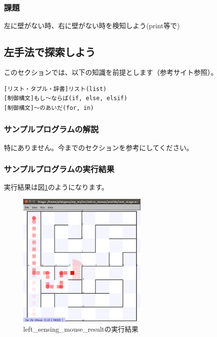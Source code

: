 \documentclass[11pt,a4paper]{jsarticle}
\begin{document}
\subsubsection{課題}
左に壁がない時、右に壁がない時を検知しよう(print等で)



\newpage
\subsection{左手法で探索しよう}
このセクションでは、以下の知識を前提とします（参考サイト参照）。
\begin{lstlisting}[frame=single]
[リスト・タプル・辞書]リスト(list)
[制御構文]もし～ならば(if, else, elsif)
[制御構文]～のあいだ(for, in)
\end{lstlisting}

\subsubsection{サンプルプログラムの解説}
特にありません。今までのセクションを参考にしてください。


\subsubsection{サンプルプログラムの実行結果}
実行結果は図\ref{left_sensing_mouse_result}のようになります。
\begin{figure}[h]
  \begin{center}
    \includegraphics[width=64mm]{./left_sensing_mouse_result.png}
  \end{center}
  \label{left_sensing_mouse_result}
  \caption{left\_sensing\_mouse\_resultの実行結果}
\end{figure}
\end{document}
